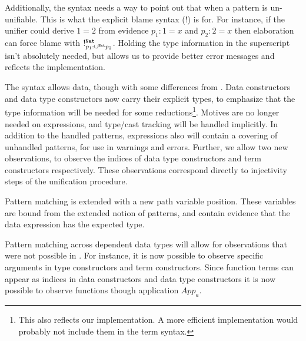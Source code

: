 Additionally, the syntax needs a way to point out that when a pattern is un-unifiable.
This is what the explicit blame syntax ($!$) is for.
For instance, if the unifier could derive $1=2$ from evidence $p_{1}:1=x$ and $p_{2}:2=x$ then elaboration can force blame with $!_{p_{1}:\cup^{\mathtt{Nat}{}}p_{2}}^{\mathtt{Nat}{}}$.
Holding the type information in the superscript isn't absolutely needed, but allows us to provide better error messages and reflects the implementation.
 
The syntax allows data, though with some differences from .
Data constructors and data type constructors now carry their explicit types, to emphasize that the type information will be needed for some reductions\footnote{
  This also reflects our implementation.
  A more efficient implementation would probably not include them in the term syntax.
}.
Motives are no longer needed on \case{} expressions, and type/cast tracking will be handled implicitly.
In addition to the handled patterns, \case{} expressions also will contain a covering of unhandled patterns, for use in warnings and errors.
Further, we allow two new observations, to observe the indices of data type constructors and term constructors respectively.
These observations correspond directly to injectivity steps of the unification procedure.
 
Pattern matching is extended with a new path variable position.
These variables are bound from the extended notion of patterns, and contain evidence that the data expression has the expected type.

Pattern matching across dependent data types will allow for observations that were not possible in .
For instance, it is now possible to observe specific arguments in type constructors and term constructors.
Since function terms can appear as indices in data constructors and data type constructors it is now possible to observe functions though application $App_{a}$.


